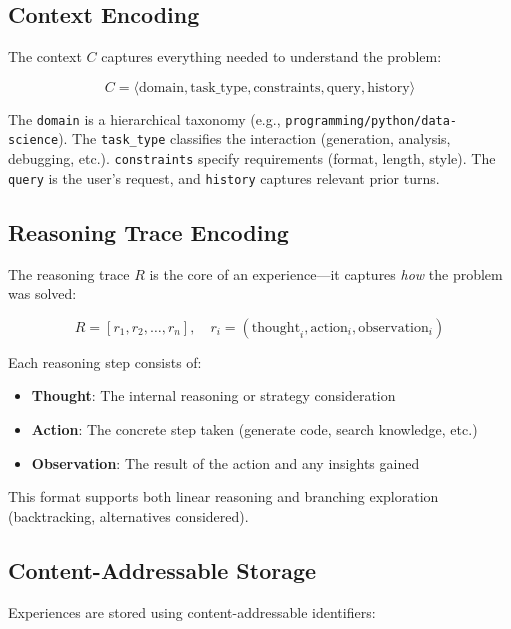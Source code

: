 \documentclass[11pt,letterpaper]{article}
\begin{document}
\subsection{Context Encoding}

The context $C$ captures everything needed to understand the problem:

\begin{equation}
C = \langle \text{domain}, \text{task\_type}, \text{constraints}, \text{query}, \text{history} \rangle
\end{equation}

The \texttt{domain} is a hierarchical taxonomy (e.g., \texttt{programming/python/data-science}). The \texttt{task\_type} classifies the interaction (generation, analysis, debugging, etc.). \texttt{constraints} specify requirements (format, length, style). The \texttt{query} is the user's request, and \texttt{history} captures relevant prior turns.

\subsection{Reasoning Trace Encoding}

The reasoning trace $R$ is the core of an experience---it captures \emph{how} the problem was solved:

\begin{equation}
R = [r_1, r_2, \ldots, r_n], \quad r_i = (\text{thought}_i, \text{action}_i, \text{observation}_i)
\end{equation}

Each reasoning step consists of:
\begin{itemize}
    \item \textbf{Thought}: The internal reasoning or strategy consideration
    \item \textbf{Action}: The concrete step taken (generate code, search knowledge, etc.)
    \item \textbf{Observation}: The result of the action and any insights gained
\end{itemize}

This format supports both linear reasoning and branching exploration (backtracking, alternatives considered).

\subsection{Content-Addressable Storage}

Experiences are stored using content-addressable identifiers:
\end{document}
